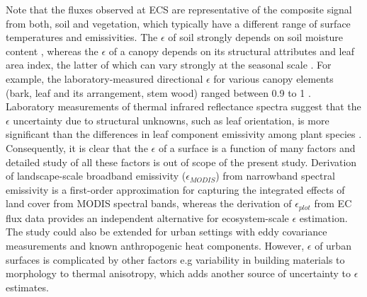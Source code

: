 \documentclass[fleqn,10pt]{wlscirep}
\begin{document}
Note that the fluxes observed at ECS are representative of the composite signal from both, soil and vegetation, which typically have a different range of surface temperatures and emissivities\cite{jin2006improved}. The $\epsilon$ of soil strongly depends on soil moisture content \cite{mira2007influence}, whereas the $\epsilon$ of a canopy depends on its structural attributes and leaf area index, the latter of which can vary strongly at the seasonal scale \cite{chen2015determining}. For example, the laboratory-measured directional $\epsilon$ for various canopy elements (bark, leaf and its arrangement, stem wood) ranged between 0.9 to 1 \cite{vishnevetsky2019method}. Laboratory measurements of thermal infrared reflectance spectra suggest that the $\epsilon$ uncertainty due to structural unknowns, such as leaf orientation, is more significant than the differences in leaf component emissivity among plant species \cite{snyder1998classification}. Consequently, it is clear that the $\epsilon$ of a surface is a function of many factors and detailed study of all these factors is out of scope of the present study. Derivation of landscape-scale broadband emissivity ($\epsilon_{MODIS}$) from narrowband spectral emissivity is a first-order approximation for capturing the integrated effects of land cover from MODIS spectral bands\cite{jin2006improved}, whereas the derivation of $\epsilon_{plot}$ from EC flux data provides an independent alternative for ecosystem-scale $\epsilon$ estimation. The study could also be extended for urban settings with eddy covariance measurements and known anthropogenic heat components. However, $\epsilon$ of urban surfaces is complicated by other factors e.g variability in building materials to morphology to thermal anisotropy, which adds another source of uncertainty to $\epsilon$ estimates\cite{chakraborty2019biases}. 
\end{document}
